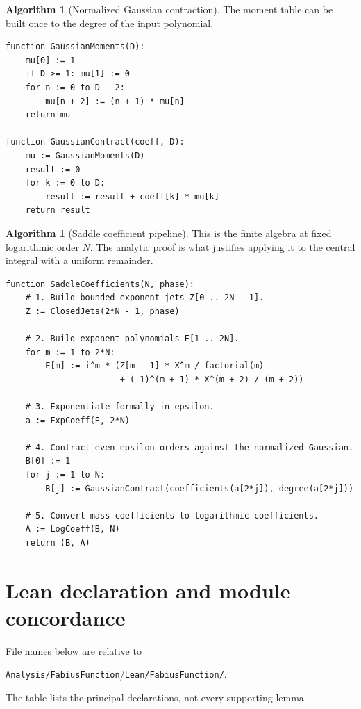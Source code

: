 \documentclass[11pt,oneside]{article}
\theoremstyle{definition}
\newtheorem{algorithm}[theorem]{Algorithm}
\theoremstyle{remark}
\newcommand{\repo}{\nolinkurl{Analysis/FabiusFunction}}
\begin{document}
\begin{algorithm}[Normalized Gaussian contraction]
\label{alg:gaussian-contraction}
The moment table can be built once to the degree of the input polynomial.
\end{algorithm}
\begin{lstlisting}[style=pseudo]
function GaussianMoments(D):
    mu[0] := 1
    if D >= 1: mu[1] := 0
    for n := 0 to D - 2:
        mu[n + 2] := (n + 1) * mu[n]
    return mu

function GaussianContract(coeff, D):
    mu := GaussianMoments(D)
    result := 0
    for k := 0 to D:
        result := result + coeff[k] * mu[k]
    return result
\end{lstlisting}

\begin{algorithm}[Saddle coefficient pipeline]
\label{alg:saddle-pipeline}
This is the finite algebra at fixed logarithmic order $N$.  The analytic proof is what
justifies applying it to the central integral with a uniform remainder.
\end{algorithm}
\begin{lstlisting}[style=pseudo]
function SaddleCoefficients(N, phase):
    # 1. Build bounded exponent jets Z[0 .. 2N - 1].
    Z := ClosedJets(2*N - 1, phase)

    # 2. Build exponent polynomials E[1 .. 2N].
    for m := 1 to 2*N:
        E[m] := i^m * (Z[m - 1] * X^m / factorial(m)
                       + (-1)^(m + 1) * X^(m + 2) / (m + 2))

    # 3. Exponentiate formally in epsilon.
    a := ExpCoeff(E, 2*N)

    # 4. Contract even epsilon orders against the normalized Gaussian.
    B[0] := 1
    for j := 1 to N:
        B[j] := GaussianContract(coefficients(a[2*j]), degree(a[2*j]))

    # 5. Convert mass coefficients to logarithmic coefficients.
    A := LogCoeff(B, N)
    return (B, A)
\end{lstlisting}

\section{Lean declaration and module concordance}
\label{app:concordance}

File names below are relative to
\begin{center}
 \repo/\texttt{Lean/FabiusFunction/}.
\end{center}
The table lists the principal declarations, not every supporting lemma.
\end{document}

